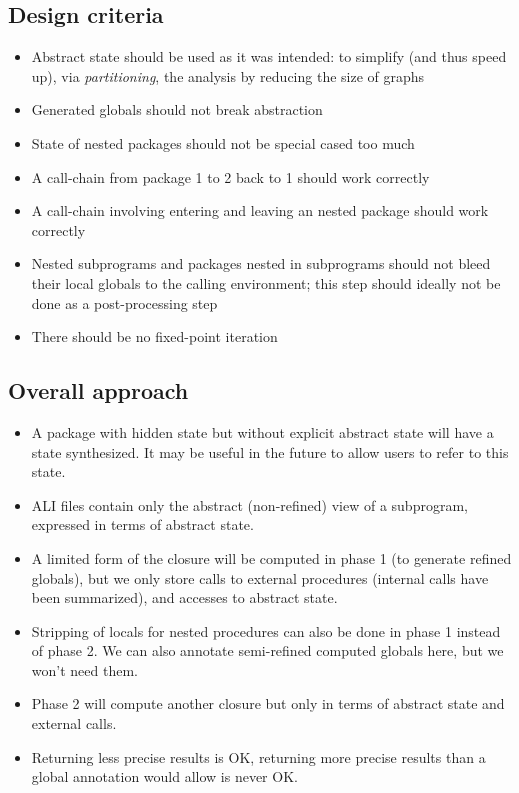 \documentclass{article}
\begin{document}
\subsection{Design criteria}
\begin{itemize}
\item Abstract state should be used as it was intended: to simplify (and
  thus speed up), via \emph{partitioning}, the analysis by reducing the
  size of graphs

\item Generated globals should not break abstraction

\item State of nested packages should not be special cased too much

\item A call-chain from package 1 to 2 back to 1 should work correctly

\item A call-chain involving entering and leaving an nested package should
  work correctly

\item Nested subprograms and packages nested in subprograms should not
  bleed their local globals to the calling environment; this step should
  ideally not be done as a post-processing step

\item There should be no fixed-point iteration

\end{itemize}

\subsection{Overall approach}
\begin{itemize}
\item A package with hidden state but without explicit abstract state will
  have a state synthesized. It may be useful in the future to allow users
  to refer to this state.

\item ALI files contain only the abstract (non-refined) view of a
  subprogram, expressed in terms of abstract state.

\item A limited form of the closure will be computed in phase 1 (to
  generate refined globals), but we only store calls to external procedures
  (internal calls have been summarized), and accesses to abstract state.

\item Stripping of locals for nested procedures can also be done in phase 1
  instead of phase 2. We can also annotate semi-refined computed globals
  here, but we won't need them.

\item Phase 2 will compute another closure but only in terms of abstract
  state and external calls.

\item Returning less precise results is OK, returning more precise results
  than a global annotation would allow is never OK.
\end{itemize}
\end{document}
